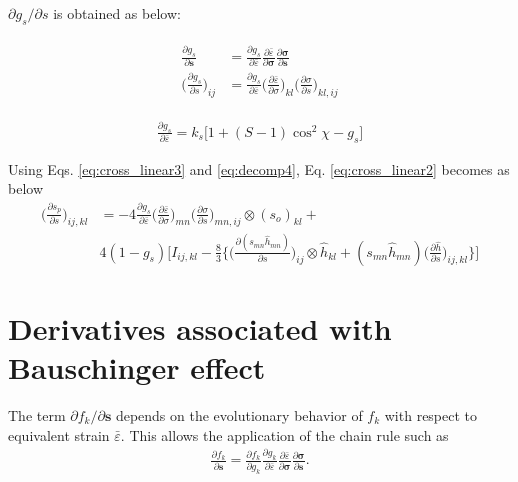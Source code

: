 \documentclass[12pt]{amsart}
\begin{document}
$\partial g_s/ \partial s$ is obtained as below:

\begin{eqnarray}
  \begin{split}
    \label{eq:cross_linear3}
    \frac{\partial g_s}{\partial\mathbf{s}}         &=\frac{\partial g_s}{\partial \bar{\varepsilon}} \frac{\partial\bar{\varepsilon}}{\partial\mathbf{\sigma}} \frac{\partial\mathbf{\sigma}}{\partial\mathbf{s}}\\
    \bigg(\frac{\partial g_s}{\partial s}\bigg)_{ij}&=\frac{\partial g_s}{\partial \bar{\varepsilon}} \bigg(\frac{\partial\bar{\varepsilon}}{\partial\sigma}\bigg)_{kl} \bigg(\frac{\partial\sigma}{\partial s}\bigg)_{kl,ij}
  \end{split}
\end{eqnarray}


\begin{eqnarray}
  \label{eq:cross_linear4}
  \frac{\partial g_s}{\partial \bar{\varepsilon}} = k_s\big[ 1+ (S-1)\cos^2\chi - g_s\big]
\end{eqnarray}

Using Eqs. \ref{eq:cross_linear3} and \ref{eq:decomp4}, Eq. \ref{eq:cross_linear2} becomes as below
\begin{equation}
  \label{eq:cross_linear2_}
  \begin{split}
    \bigg(\frac{\partial s_p}{\partial s} \bigg)_{ij,kl} &= -4
    \frac{\partial g_s}{\partial \bar{\varepsilon}} \bigg(\frac{\partial\bar{\varepsilon}}{\partial\sigma}\bigg)_{mn} \bigg(\frac{\partial\sigma}{\partial s}\bigg)_{mn,ij}
    \otimes (s_o)_{kl} +\\
    &4(1-g_s)
    \Bigg[I_{ij,kl} -  \frac{8}{3}\bigg\{ \bigg(\frac{\partial(s_{mn}\hat{h}_{mn})}{\partial s}\bigg)_{ij} \otimes \hat{h}_{kl}+ (s_{mn}\hat{h}_{mn}) \bigg(\frac{\partial\hat{h}}{\partial s}\bigg)_{ij,kl}  \bigg\}
    \Bigg]
  \end{split}
\end{equation}


\newpage
\section{Derivatives associated with Bauschinger effect}
\label{sec:bauschinger}


The term $\partial f_k/\partial\mathbf{s}$ depends on the evolutionary behavior of $f_k$ with respect to equivalent strain $\bar{\varepsilon}$.
This allows the application of the chain rule such as
\begin{eqnarray}
  \label{eq:dphib7}
  \frac{\partial f_k}{\partial\mathbf{s}}=\frac{\partial f_k}{\partial g_k} \frac{\partial g_k}{\partial \bar{\varepsilon}}  \frac{\partial{\bar{\varepsilon}}}{\partial\mathbf{\sigma}} \frac{\partial\mathbf{\sigma}}{\partial\mathbf{s}}.
\end{eqnarray}
\end{document}
